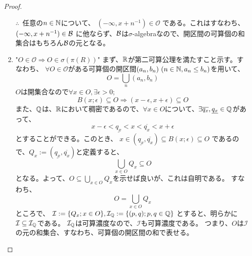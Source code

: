 \begin{proof}
\begin{enumerate}[font = \bfseries, label = step \arabic*.]
                    $\therefore$\ 任意の$n\in{\mathbb{N}}$について、
                    $(-\infty, x + n^{-1})\in\mathcal{O}$
                    である。これはすなわち、
                    $(-\infty, x + n^{-1})\in{\mathcal{B}}$
                    に他ならず、${\mathcal{B}}$は$\sigma$-algebraなので、開区間の可算個の和集合はもちろん${\mathcal{B}}$の元となる。
    
                \item "$O\in\mathcal{O} \Rightarrow O \in \sigma(\pi(R))$"
                    まず、${\mathbb{R}}$が第二可算公理を満たすこと示す。すなわち、
                    $\forall O \in \mathcal{O}$がある可算個の開区間$(a_n, b_n)\ (n\in{\mathbb{N}}, a_n \leq b_n)$を用いて、
                    \[
                        O = \bigcup_{n} (a_n, b_n)
                    \]
                    $O$は開集合なので$\forall x \in O,\exists\epsilon > 0;$
                    \[
                        B(x;\epsilon) \subseteq O \Rightarrow (x-\epsilon, x + \epsilon)\subseteq O
                    \]
                    また、${\mathbb{Q}}$は、${\mathbb{R}}$において稠密であるので、$\forall x \in O$について、$\exists\overline{q_x}, \underline{q_x}\in {\mathbb{Q}}$があって、
                    \[
                        x - \epsilon < \underline{q_x} < x < \overline{q_x} < x + \epsilon
                    \]
                    とすることができる。このとき、
                    $x \in (\underline{q_x}, \overline{q_x}) \subseteq B(x;\epsilon) \subseteq O$
                    であるので、$Q_x := (\underline{q_x}, \overline{q_x})$と定義すると、
                    \[
                        \bigcup_{x\in O} Q_x \subseteq O
                    \]
                    となる。よって、$O \subseteq \bigcup_{x\in O} Q_x$を示せば良いが、これは自明である。
                    すなわち、
                    \[
                        O = \bigcup_{x\in O} Q_x
                    \]
                    ところで、
                    $\mathcal{I} := \{Q_x;x\in O\}, \mathcal{I}_{\mathbb{Q}} := \{(p,q); p,q\in{\mathbb{Q}}\}$
                    とすると、明らかに$\mathcal{I} \subseteq \mathcal{I}_{\mathbb{Q}}$である。
                    $\mathcal{I}_{\mathbb{Q}}$は可算濃度なので、$\mathcal{I}$も可算濃度である。
                    つまり、$O$は$\mathcal{I}$の元の和集合、すなわち、可算個の開区間の和で表せる。
                    

\end{enumerate}
\end{proof}
